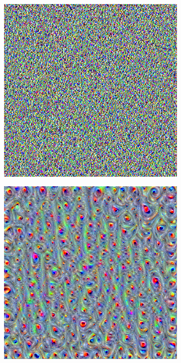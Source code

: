 \begin{figure}
    \captionsetup{justification=centering}
    
    \begin{subfigure}[t]{0.31\textwidth}
        \captionsetup{justification=centering}
        \centering
        \includegraphics[width=.7\linewidth]{figuras/feat_vis/experiments/intermediary/l6/random_image_pl1_lr4e-1_layer12_no-blur.png}
        \caption{}
    \end{subfigure}
    \hfill
    \begin{subfigure}[t]{0.31\textwidth}
        \captionsetup{justification=centering}
        \centering
        \includegraphics[width=.7\linewidth]{figuras/feat_vis/experiments/intermediary/l6/random_image_pl4_lr4e-2_layer12_no-blur.png}
        \caption{}
    \end{subfigure}

\end{figure}

